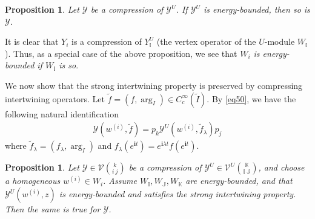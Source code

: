 \documentclass[12pt,a4paper]{article}
\theoremstyle{definition}
\theoremstyle{plain}
\newtheorem{pp}[df]{Proposition}
\newcommand{\mc}{\mathcal}
\newcommand{\wtd}{\widetilde}
\newcommand{\im}{\mathbf{i}}
\newcommand{\mbb}{\mathbb}
\numberwithin{equation}{subsection}
\begin{document}
\begin{pp}\label{lb90}
	Let $\mc Y$ be a compression of $\mc Y^U$. If $\mc Y^U$ is energy-bounded, then so is $\mc Y$.
\end{pp}

It is clear that $Y_i$  is a compression of $Y^U_{\mbb I}$ (the vertex operator of the $U$-module $W_{\mbb I}$). Thus, as a special case of the above proposition, we see that \emph{$W_i$ is energy-bounded if $W_{\mbb I}$ is so}. 


We now show that the strong intertwining property is preserved by compressing intertwining operators. Let $\wtd f=(f,\arg_I)\in C_c^\infty(\wtd I)$. By \eqref{eq50}, we have the following natural identification
\begin{align}
\mc Y(w^{(i)},\wtd f)=p_k\mc Y^U(w^{(i)},\wtd f_\lambda)p_j
\end{align}
where $\wtd f_\lambda=(f_\lambda,\arg_I)$ and $f_\lambda(e^{\im t})=e^{\im\lambda t}f(e^{\im t})$.

\begin{pp}\label{lb91}
	Let $\mc Y\in\mc V{k\choose i~j}$ be a compression of  $\mc Y^U\in\mc V^U{\mbb K\choose \mbb I~\mbb J}$, and choose a homogeneous $w^{(i)}\in W_i$. Assume  $W_{\mbb I},W_{\mbb J},W_{\mbb K}$ are  energy-bounded, and that $\mc Y^U(w^{(i)},z)$ is energy-bounded and satisfies the strong intertwining property. Then the same is true for $\mc Y$.
\end{pp}
\end{document}
